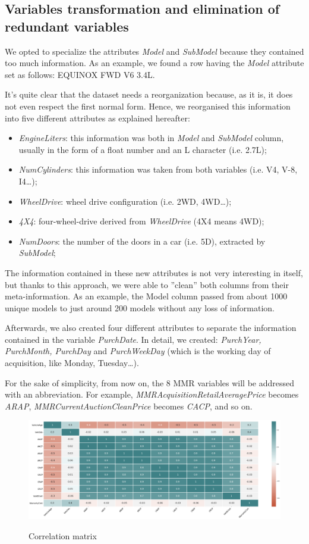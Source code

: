 \documentclass{article}
\begin{document}
	\subsection{Variables transformation and elimination of redundant variables}
	We opted to specialize the attributes \emph{Model} and \emph{SubModel} because they contained too much information. As an example, we found a row having the \emph{Model} attribute set as follows: EQUINOX FWD V6 3.4L. 
	
	It's quite clear that the dataset needs a reorganization because, as it is, it does not even respect the first normal form. Hence, we reorganised this information into five different attributes as explained hereafter:
	\begin{itemize}
		\item \emph{EngineLiters}: this information was both in \emph{Model} and \emph{SubModel} column, usually in the form of a float number and an L character (i.e. 2.7L);
		\item \emph{NumCylinders}: this information was taken from both variables (i.e. V4, V-8, I4\dots);
		\item \emph{WheelDrive}: wheel drive configuration (i.e. 2WD, 4WD\dots);
		\item \emph{4X4}: four-wheel-drive derived from \emph{WheelDrive} (4X4 means 4WD);
		\item \emph{NumDoors}: the number of the doors in a car (i.e. 5D), extracted by \emph{SubModel};
	\end{itemize}
	
	The information contained in these new attributes is not very interesting in itself, but thanks to this approach, we were able to ”clean” both columns from their meta-information. As an example, the Model column passed from about 1000 unique models to just around 200 models without any loss of information. 
	
	Afterwards, we also created four different attributes to separate the information contained in the variable \emph{PurchDate}. In detail, we created: \emph{PurchYear, PurchMonth, PurchDay} and \emph{PurchWeekDay} (which is the working day of acquisition, like Monday, Tuesday\dots).
	
	For the sake of simplicity, from now on, the 8 MMR variables will be addressed with an abbreviation. For example, \emph{MMRAcquisitionRetailAveragePrice} becomes \emph{ARAP}, \emph{MMRCurrentAuctionCleanPrice} becomes \emph{CACP}, and so on.
	
	
	\begin{figure}[H]
		\centering
		{\includegraphics[width=\textwidth]{corr.png}}
		\caption{{ Correlation matrix }}
		\label{fig:corr}
	\end{figure}
	
\end{document}
